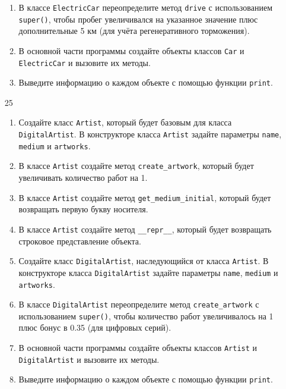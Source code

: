 \begin{enumerate}
\begin{enumerate}
    \item В классе \texttt{ElectricCar} переопределите метод \texttt{drive} с использованием \texttt{super()}, чтобы пробег увеличивался на указанное значение плюс дополнительные 5 км (для учёта регенеративного торможения).
    
    \item В основной части программы создайте объекты классов \texttt{Car} и \texttt{ElectricCar} и вызовите их методы.
    
    \item Выведите информацию о каждом объекте с помощью функции \texttt{print}.
\end{enumerate}

\item[25] 
\begin{enumerate}
    \item Создайте класс \texttt{Artist}, который будет базовым для класса \texttt{DigitalArtist}. В конструкторе класса \texttt{Artist} задайте параметры \texttt{name}, \texttt{medium} и \texttt{artworks}.
    
    \item В классе \texttt{Artist} создайте метод \texttt{create\_artwork}, который будет увеличивать количество работ на 1.
    
    \item В классе \texttt{Artist} создайте метод \texttt{get\_medium\_initial}, который будет возвращать первую букву носителя.
    
    \item В классе \texttt{Artist} создайте метод \texttt{\_\_repr\_\_}, который будет возвращать строковое представление объекта.
    
    \item Создайте класс \texttt{DigitalArtist}, наследующийся от класса \texttt{Artist}. В конструкторе класса \texttt{DigitalArtist} задайте параметры \texttt{name}, \texttt{medium} и \texttt{artworks}.
    
    \item В классе \texttt{DigitalArtist} переопределите метод \texttt{create\_artwork} с использованием \texttt{super()}, чтобы количество работ увеличивалось на 1 плюс бонус в 0.35 (для цифровых серий).
    
    \item В основной части программы создайте объекты классов \texttt{Artist} и \texttt{DigitalArtist} и вызовите их методы.
    
    \item Выведите информацию о каждом объекте с помощью функции \texttt{print}.
\end{enumerate}


\end{enumerate}
